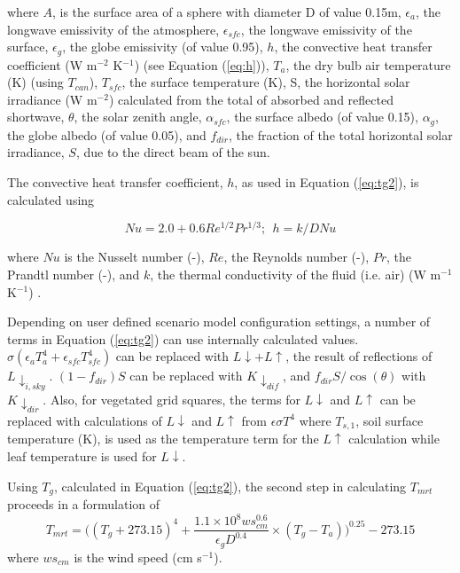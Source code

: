 \documentclass[final,3p,times,authoryear]{elsarticle}
\begin{document}
where $A$, is the surface area of a sphere with diameter D of value 0.15m,
$\epsilon_{a}$, the longwave emissivity of the atmosphere, 
$\epsilon_{sfc}$, the longwave emissivity of the surface, 
$\epsilon_{g}$, the globe emissivity (of value 0.95), 
$h$, the convective heat transfer coefficient (W m$^{-2}$ K$^{-1}$) (see Equation (\ref{eq:h})), 
$T_{a}$, the dry bulb air temperature (K) (using $T_{can}$), 
$T_{sfc}$, the surface temperature (K), 
S, the horizontal solar irradiance (W m$^{-2}$) calculated from the total of absorbed and reflected shortwave, 
$\theta$, the solar zenith angle, 
$\alpha_{sfc}$, the surface albedo (of value 0.15),  
$\alpha_{g}$, the globe albedo (of value 0.05), and 
$f_{dir}$, the fraction of the total horizontal solar irradiance, 
$S$, due to the direct beam of the sun. 




The convective heat transfer coefficient, $h$, as used in Equation (\ref{eq:tg2}), is calculated using 

\begin{equation}\label{eq:h}
Nu = 2.0 + 0.6Re^{1/2}Pr^{1/3};  ~~h = k / D Nu
\end{equation}

where $Nu$ is the Nusselt number (-),
$Re$, the Reynolds number (-),
$Pr$, the Prandtl number (-), and 
$k$, the thermal conductivity of the fluid (i.e. air) (W m$^{-1}$K$^{-1}$) \citep{Liljegren2008}.



Depending on user defined scenario model configuration settings, a number of terms in Equation (\ref{eq:tg2}) can use internally calculated values. $\sigma (\epsilon_{a} T_{a}^{4} + \epsilon_{sfc} T_{sfc}^{4} )$ can be replaced with $L\downarrow + L\uparrow$, the result of reflections of $L \downarrow_{i,sky}$. $(1-f_{dir})S$ can be replaced with $K \downarrow_{dif}$, and $f_{dir}S/ \cos(\theta)$ with $K \downarrow_{dir}$. Also, for vegetated grid squares, the terms for $L\downarrow$ and $L\uparrow$ can be replaced with calculations of $L\downarrow$ and $L\uparrow$ from $\epsilon \sigma T^{4}$ where $T_{s,1}$, soil surface temperature (K), is used as the temperature term for the $L\uparrow$ calculation while leaf temperature is used for $L\downarrow$. 

Using $T_{g}$, calculated in Equation (\ref{eq:tg2}), the second step in calculating $T_{mrt}$ proceeds in a formulation of \cite{Kantor2011} 
\begin{equation}\label{eq:tmrtbucket}
  T_{mrt} = 
  \bigg(
   (T_{g}+273.15)^{4} + 
    \frac{1.1 \times 10^{8}  ws_{cm}^{0.6}}{\epsilon_{g}  D^{0.4}}
    \times 
     (T_{g}-T_{a})
    \bigg)^{0.25} - 273.15
\end{equation}
 where $ws_{cm}$ is the wind speed (cm s$^{-1}$).
\end{document}
